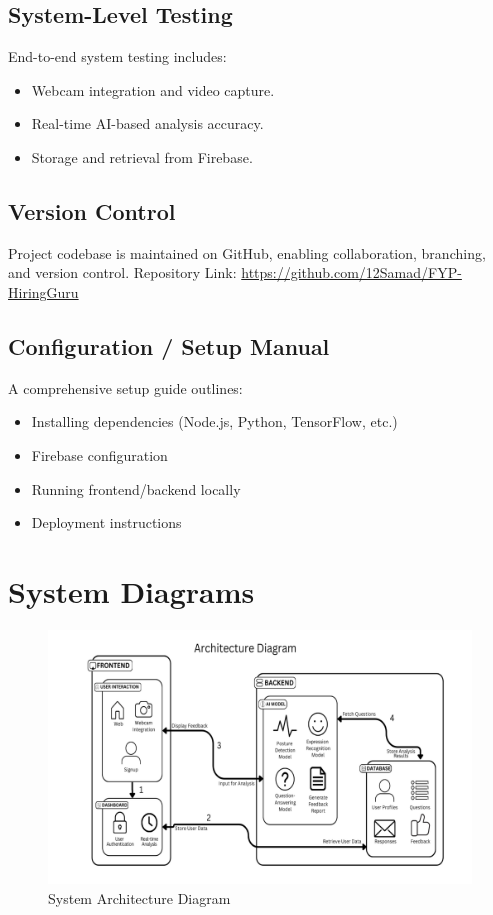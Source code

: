 \subsection{System-Level Testing}
End-to-end system testing includes:

\begin{itemize}
  \item Webcam integration and video capture.
  \item Real-time AI-based analysis accuracy.
  \item Storage and retrieval from Firebase.
\end{itemize}

\subsection{Version Control}
Project codebase is maintained on GitHub, enabling collaboration, branching, and version control. Repository Link: \url{https://github.com/12Samad/FYP-HiringGuru}

\subsection{Configuration / Setup Manual}
A comprehensive setup guide outlines:

\begin{itemize}
  \item Installing dependencies (Node.js, Python, TensorFlow, etc.)
  \item Firebase configuration
  \item Running frontend/backend locally
  \item Deployment instructions
\end{itemize}

\section{System Diagrams}

\begin{figure}[h]
\centering
\includegraphics[width=0.8\linewidth]{sections/diagrams/ArchitectureDiagram.png}
\caption{System Architecture Diagram}
\label{fig:architecture}
\end{figure}

